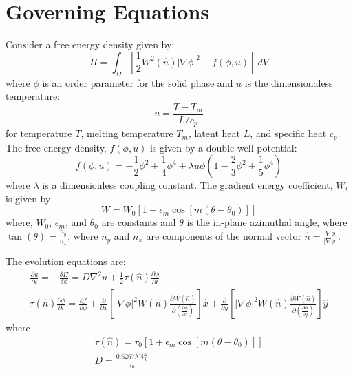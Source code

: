 \documentclass[10pt]{article}
\begin{document}
\section{Governing Equations}

Consider a free energy density given by:
\begin{equation}
  \Pi = \int_{\Omega}   \left[ \frac{1}{2} W^2(\hat{n})|\nabla \phi|^2+f(\phi,u) \right]   ~dV 
\end{equation}
where $\phi$ is an order parameter for the solid phase and $u$ is the dimensionaless temperature:
\begin{equation}
u = \frac{T - T_m}{L/c_p}
\end{equation}
for temperature $T$, melting temperature $T_m$, latent heat $L$, and specific heat $c_p$. The free energy density, $f(\phi,u)$ is given by a double-well potential:
\begin{equation}
f(\phi,u) = -\frac{1}{2}\phi^2 + \frac{1}{4}\phi^4 + \lambda u \phi \left(1-\frac{2}{3} \phi^2+\frac{1}{5}\phi^4 \right)
\end{equation}
where $\lambda$ is a dimensionless coupling constant. The gradient energy coefficient, $W$, is given by 
\begin{equation}
W = W_0 [1+\epsilon_m \cos[m(\theta-\theta_0)]]
\end{equation}
where, $W_0$, $\epsilon_m$, and $\theta_0$ are constants and $\theta$ is the in-plane azimuthal angle, where $\tan(\theta) = \frac{n_y}{n_x}$, where $n_y$ and $n_x$ are components of the normal vector $\hat{n} = \frac{\nabla \phi}{|\nabla \phi|}$.

The evolution equations are:
\begin{gather}
\frac{\partial u}{\partial t} = - \frac{\delta \Pi}{\delta \phi} = D \nabla^2 u + \frac{1}{2} \tau(\hat{n}) \frac{\partial \phi}{\partial t} \\
\tau(\hat{n}) \frac{\partial \phi}{\partial t} = \frac{\partial f}{\partial \phi} + \frac{\partial}{\partial x} \left[ |\nabla \phi|^2 W(\hat{n}) \frac{\partial W(\hat{n})}{\partial \left( \frac{\partial \phi}{\partial x} \right)} \right] \hat{x} + \frac{\partial}{\partial y} \left[ |\nabla \phi|^2 W(\hat{n}) \frac{\partial W(\hat{n})}{\partial \left( \frac{\partial \phi}{\partial y} \right)} \right] \hat{y} 
\end{gather}
where
\begin{gather}
\tau(\hat{n}) = \tau_0 [1+\epsilon_m \cos[m(\theta-\theta_0)]] \\
D = \frac{0.6267 \lambda W_0^2}{\tau_0}
\end{gather}
\end{document}

